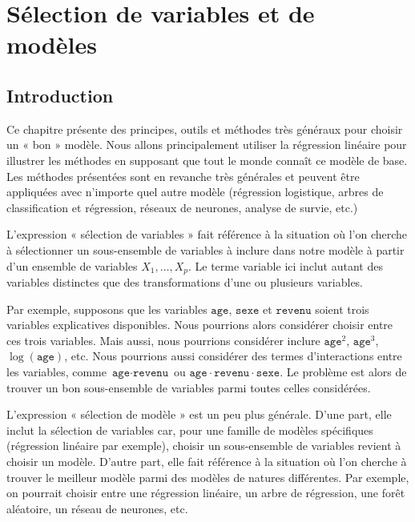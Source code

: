 \documentclass[
  11pt,
  letterpaper,
]{scrbook}
\theoremstyle{definition}
\theoremstyle{remark}
\begin{document}

\hypertarget{selection-modele}{%
\chapter{Sélection de variables et de modèles}\label{selection-modele}}

\hypertarget{introduction-2}{%
\section{Introduction}\label{introduction-2}}

Ce chapitre présente des principes, outils et méthodes très généraux
pour choisir un « bon » modèle. Nous allons principalement utiliser la
régression linéaire pour illustrer les méthodes en supposant que tout le
monde connaît ce modèle de base. Les méthodes présentées sont en
revanche très générales et peuvent être appliquées avec n'importe quel
autre modèle (régression logistique, arbres de classification et
régression, réseaux de neurones, analyse de survie, etc.)

L'expression « sélection de variables » fait référence à la situation où
l'on cherche à sélectionner un sous-ensemble de variables à inclure dans
notre modèle à partir d'un ensemble de variables \(X_1, \ldots, X_p\).
Le terme variable ici inclut autant des variables distinctes que des
transformations d'une ou plusieurs variables.

Par exemple, supposons que les variables \(\texttt{age}\),
\(\texttt{sexe}\) et \(\texttt{revenu}\) soient trois variables
explicatives disponibles. Nous pourrions alors considérer choisir entre
ces trois variables. Mais aussi, nous pourrions considérer inclure
\(\texttt{age}^2\), \(\texttt{age}^3\), \(\log(\texttt{age})\), etc.
Nous pourrions aussi considérer des termes d'interactions entre les
variables, comme \(\texttt{age} \cdot \texttt{revenu}\) ou
\(\texttt{age}\cdot\texttt{revenu}\cdot\texttt{sexe}\). Le problème est
alors de trouver un bon sous-ensemble de variables parmi toutes celles
considérées.

L'expression « sélection de modèle » est un peu plus générale. D'une
part, elle inclut la sélection de variables car, pour une famille de
modèles spécifiques (régression linéaire par exemple), choisir un
sous-ensemble de variables revient à choisir un modèle. D'autre part,
elle fait référence à la situation où l'on cherche à trouver le meilleur
modèle parmi des modèles de natures différentes. Par exemple, on
pourrait choisir entre une régression linéaire, un arbre de régression,
une forêt aléatoire, un réseau de neurones, etc.
\end{document}

